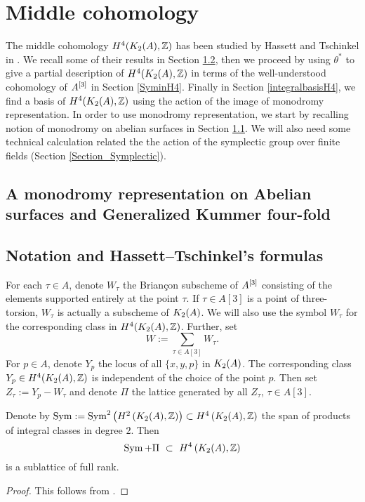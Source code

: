 
 \section{Middle cohomology}\label{Middle}
The middle cohomology $H^4(K_{ 2 }( A ),\mathbb{Z})$ has been studied by Hassett and Tschinkel in \cite{Hassett}. We recall some of their results in Section \ref{HassetTschinkelSection},
then we proceed by using $\theta^*$ to give a partial description of $H^4(K_{ 2 }( A ),\mathbb{Z})$ in terms of the well-understood cohomology of $A^{[3]}$ in Section \ref{SyminH4}. 
Finally in Section \ref{integralbasisH4}, we find a basis of $H^4(K_{ 2 }( A ),\mathbb{Z})$ using the action of the image of monodromy representation.
In order to use monodromy representation, we start by recalling notion of monodromy on abelian surfaces in Section \ref{monodromyexplication}. We will also need some technical calculation related the the action of the symplectic group over finite fields (Section \ref{Section_Symplectic}).
\subsection{A monodromy representation on Abelian surfaces and Generalized Kummer four-fold}\label{monodromyexplication}


\subsection{Notation and Hassett--Tschinkel's formulas}\label{HassetTschinkelSection}
\begin{notation}\label{TheZs}
For each $\tau \in A$, denote $W_\tau$ the Brian\c con subscheme of $A^{[3]}$ consisting of the elements supported entirely at the point $\tau$. If $\tau\in A[3]$ is a point of three-torsion, $W_\tau$ is actually a subscheme of $K_{ 2 }( A )$. We will also use the symbol $W_\tau$ for the corresponding class in $H^4(K_{ 2 }( A ),\mathbb{Z})$. Further, set 
$$
W := \sum_{\tau\in A[3]} W_\tau.
$$
For $p\in A$, denote $Y_p$ the locus of all $\{x,y,p\}$ in $K_{ 2 }( A )$. The corresponding class $Y_p \in H^4(K_{ 2 }( A ),\mathbb{Z})$ is independent of the choice of the point $p$. Then set $Z_\tau := Y_p - W_\tau$ and denote $\Pi$ the lattice generated by all $Z_\tau$, $\tau \in A[3]$.
\end{notation}
\begin{proposition}
Denote by $\operatorname{Sym} := \operatorname{Sym}^2\left(H^2\left(K_{ 2 }( A ),\mathbb{Z}\right)\right) \subset H^4\left(K_{ 2 }( A ),\mathbb{Z}\right) $ the span of products of integral classes in degree $2$.
Then 
$$
\Sym+\Pi \ \subset\  H^4\left(\X,\Z\right)
$$
is a sublattice  of full rank.  
\end{proposition}
\begin{proof}
This follows from \cite[Proposition 4.3]{Hassett}.
\end{proof}

